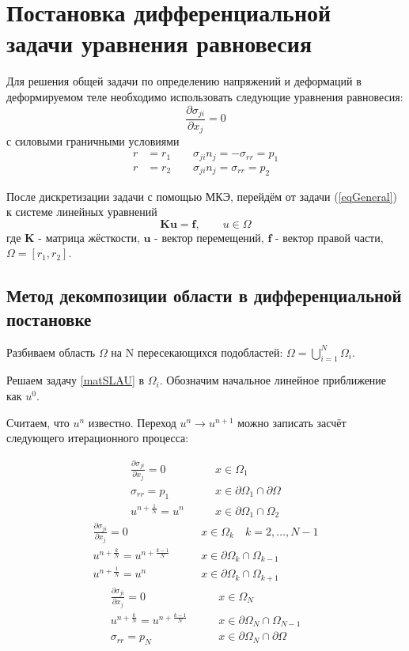 \documentclass[a4paper,14pt]{extarticle}
\begin{document}
\section{Постановка дифференциальной задачи уравнения равновесия}

Для решения общей задачи по определению напряжений и деформаций в деформируемом теле необходимо использовать следующие уравнения равновесия:
\begin{equation}\label{eqGeneral}
\frac{\partial \sigma_{ji}}{\partial x_{j}}=0
\end{equation}
с силовыми граничными условиями
\begin{align}
r &=r_1 \qquad  \sigma_{j i} n_j = -\sigma_{rr}=p_1 \\
r &=r_2 \qquad  \sigma_{j i} n_j = \sigma_{rr}=p_2
\end{align}

После дискретизации задачи с помощью МКЭ, перейдём от задачи (\ref{eqGeneral}) к системе линейных уравнений
\begin{equation}\label{matSLAU}
\textbf{Ku}=\textbf{f}, \qquad u\in \Omega 
\end{equation}
где $\textbf{K}$ - матрица жёсткости, $\textbf{u}$ - вектор перемещений, $\textbf{f}$ - вектор правой части, $\Omega=[r_1, r_2]$.

\subsection{Метод декомпозиции области в дифференциальной постановке}

Разбиваем область $\Omega$ на N пересекающихся подобластей: $\Omega=\bigcup_{i=1}^{N} \Omega_{i}$. 

Решаем задачу \ref{matSLAU} в $\Omega_i$. Обозначим начальное линейное приближение как $u^0$. 

Считаем, что $u^{n}$ известно. Переход $u^n \rightarrow u^{n+1}$ можно записать засчёт следующего итерационного процесса:

\begin{align*}
\frac{\partial \sigma_{ji}}{\partial x_{j}}=0 \qquad  &x\in\Omega_1 \\
\sigma_{rr}=p_{1} \qquad &x\in \partial \Omega_1 \cap \partial \Omega \\
u^{n+\frac{1}{N}}=u^n \qquad &x\in \partial \Omega_1 \cap \Omega_2 
\end{align*}
\begin{align*}
\frac{\partial \sigma_{ji}}{\partial x_{j}}=0 \qquad  &x\in\Omega_k \quad k=2,\ldots,N-1 \\
u^{n+\frac{k}{N}}=u^{n+\frac{k-1}{N}} \qquad &x\in \partial \Omega_k \cap \Omega_{k-1} \\
u^{n+\frac{1}{N}}=u^n \qquad &x\in \partial \Omega_k \cap \Omega_{k+1} 
\end{align*}
\begin{align*}
\frac{\partial \sigma_{ji}}{\partial x_{j}}=0 \qquad  &x\in\Omega_N \\
u^{n+\frac{k}{N}}=u^{n+\frac{k-1}{N}} \qquad &x\in \partial \Omega_N \cap \Omega_{N-1} \\
\sigma_{rr}=p_{N} \qquad &x\in \partial \Omega_N \cap \partial \Omega 
\end{align*}
\end{document}
